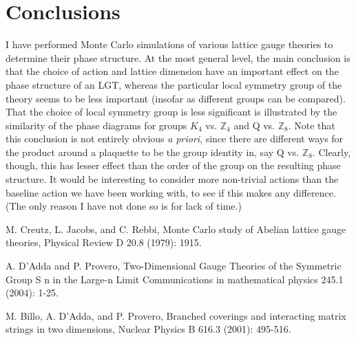 \documentclass[9pt,twocolumn,twoside]{article}
\begin{document}
\section{Conclusions}
I have performed Monte Carlo simulations of various lattice gauge theories to determine their phase structure.  At the most general level, the main conclusion is that the choice of action and lattice dimension have an important effect on the phase structure of an LGT, whereas the particular local symmetry group of the theory seems to be less important (insofar as different groups can be compared).  That the choice of local symmetry group is less significant is illustrated by the similarity of the phase diagrams for groups $K_4$ vs. $\mathbb{Z}_4$ and Q vs. $\mathbb{Z}_8$.  Note that this conclusion is not entirely obvious \textit{a priori}, since there are different ways for the product around a plaquette to be the group identity in, say Q vs. $\mathbb{Z}_8$.  Clearly, though, this has lesser effect than the order of the group on the resulting phase structure.  It would be interesting to consider more non-trivial actions than the baseline action we have been working with, to see if this makes any difference.  (The only reason I have not done so is for lack of time.)


\begin{thebibliography}{9}

	M. Creutz, L. Jacobs, and C. Rebbi, 
	Monte Carlo study of Abelian lattice gauge theories, 
	Physical Review D 20.8 (1979): 1915.

	A. D’Adda and P. Provero,
	Two-Dimensional Gauge Theories of the Symmetric Group S n in the Large-n Limit
	Communications in mathematical physics 245.1 (2004): 1-25.

	M. Billo, A. D'Adda, and P. Provero,
	Branched coverings and interacting matrix strings in two dimensions,
	Nuclear Physics B 616.3 (2001): 495-516.


\end{thebibliography}
\end{document}
